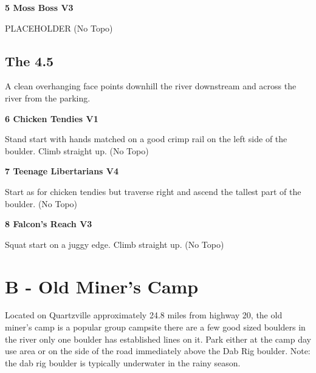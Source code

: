 \begin{multicols}{2}
		
			
			\needspace{1.5cm}
\label{rt:Moss Boss}
\colorbox{green!20}{
\parbox{0.95\linewidth}{
\textbf{
5 Moss Boss V3  
}}}

			\begin{adjustwidth}{0.5cm}{}			
			PLACEHOLDER (No Topo)
			\end{adjustwidth}
			
			
		
		
		\needspace{1.5cm}
		\subsection*{The 4.5}\label{bf:The 4.5}
		A clean overhanging face points downhill the river downstream and across the river from the parking.\\
	
		
			
			\needspace{1.5cm}
\label{rt:Chicken Tendies}
\colorbox{green!20}{
\parbox{0.95\linewidth}{
\textbf{
6 Chicken Tendies V1  
}}}

			\begin{adjustwidth}{0.5cm}{}			
			Stand start with hands matched on a good crimp rail on the left side of the boulder. Climb straight up. (No Topo)
			\end{adjustwidth}
			
			
			
			\needspace{1.5cm}
\label{rt:Teenage Libertarians}
\colorbox{RoyalBlue!20}{
\parbox{0.95\linewidth}{
\textbf{
7 Teenage Libertarians V4  
}}}

			\begin{adjustwidth}{0.5cm}{}			
			Start as for chicken tendies but traverse right and ascend the tallest part of the boulder. (No Topo)
			\end{adjustwidth}
			
			
			
			\needspace{1.5cm}
\label{rt:Falcon's Reach}
\colorbox{green!20}{
\parbox{0.95\linewidth}{
\textbf{
8 Falcon's Reach V3  
}}}

			\begin{adjustwidth}{0.5cm}{}			
			Squat start on a juggy edge. Climb straight up. (No Topo)
			\end{adjustwidth}
			
			
		
	
\newpage
	
		\section{B - Old Miner's Camp}\label{sa:Old Miner's Camp}
	Located on Quartzville approximately 24.8 miles from highway 20, the old miner's camp is a popular group campsite there are a few good sized boulders in the river only one boulder has established lines on it. Park either at the camp day use area or on the side of the road immediately above the Dab Rig boulder. Note: the dab rig boulder is typically underwater in the rainy season.\\


\end{multicols}
